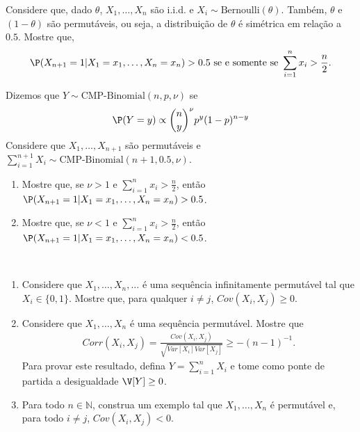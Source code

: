 \begin{exercise}
 Considere que, dado $\theta$,
 $X_{1},\ldots,X_{n}$ são i.i.d. e 
 $X_{i} \sim \text{Bernoulli}(\theta)$.
 Também, $\theta$ e $(1-\theta)$ são permutáveis,
 ou seja, a distribuição de $\theta$ é
 simétrica em relação a $0.5$.
 Mostre que,
 \begin{align*}
  \P(X_{n+1}=1|X_{1}=x_{1},\ldots,X_{n}=x_{n}) > 0.5
  \text{ se e somente se }
  \sum_{i=1}^{n}{x_i} > \frac{n}{2}.
 \end{align*}
\end{exercise}

\begin{exercise}
 Dizemos que $Y \sim \text{CMP-Binomial}(n,p,\nu)$ 
 \citep{Kadane2016} se
 \begin{align*}
  \P(Y=y) \propto {n \choose y}^{\nu}p^{y}(1-p)^{n-y}
 \end{align*}
 Considere que $X_{1},\ldots,X_{n+1}$ são permutáveis e
 $\sum_{i=1}^{n+1}{X_{i}} \sim \text{CMP-Binomial}(n+1,0.5,\nu)$.
 \begin{enumerate}[label=(\alph*)]
  \item Mostre que, se $\nu > 1$ e
  $\sum_{i=1}^{n}{x_i} > \frac{n}{2}$, então
  $\P(X_{n+1}=1|X_{1}=x_{1},\ldots,X_{n}=x_{n}) > 0.5$.
  \item Mostre que, se $\nu < 1$ e
  $\sum_{i=1}^{n}{x_i} > \frac{n}{2}$, então
  $\P(X_{n+1}=1|X_{1}=x_{1},\ldots,X_{n}=x_{n}) < 0.5$.
 \end{enumerate}
\end{exercise}

\begin{exercise} \
 \begin{enumerate}[label=(\alph*)]
  \item Considere que $X_{1},\ldots,X_{n},\ldots$ é
  uma sequência infinitamente permutável tal que
  $X_{i} \in \{0,1\}$.
  Mostre que, para qualquer $i \neq j$,
  $Cov(X_{i},X_{j}) \geq 0$.
  
  \item Considere que $X_{1},\ldots,X_{n}$ é
  uma sequência permutável. Mostre que
  \begin{align*}
   Corr(X_{i},X_{j}) 
   =\frac{Cov(X_{i},X_{j})}
   {\sqrt{Var[X_{i}]Var[X_{j}]}} \geq -(n-1)^{-1}.
  \end{align*}
  Para provar este resultado,
  defina $Y = \sum_{i=1}^{n}{X_{i}}$ e
  tome como ponte de partida a desigualdade
  $\V[Y] \geq 0$.
	
  \item Para todo $n \in \mathbb{N}$, 
  construa um exemplo tal que
  $X_{1},\ldots,X_{n}$ é permutável e,
  para todo $i \neq j$, $Cov(X_{i},X_{j}) < 0$.
 \end{enumerate}
\end{exercise}

